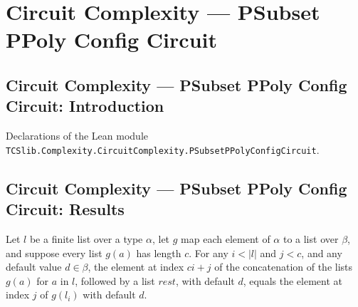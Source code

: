 \section{Circuit Complexity --- PSubset PPoly Config Circuit}
\subsection*{Circuit Complexity --- PSubset PPoly Config Circuit: Introduction}

Declarations of the Lean module \texttt{TCSlib.Complexity.CircuitComplexity.PSubsetPPolyConfigCircuit}.

\subsection*{Circuit Complexity --- PSubset PPoly Config Circuit: Results}

\begin{theorem}
\label{Complexity.getD_flatMap_chunk}
\leanok
{}
Let $l$ be a finite list over a type $\alpha$, let $g$ map each element of $\alpha$ to a
list over $\beta$, and suppose every list $g(a)$ has length $c$. For any $i<|l|$ and
$j<c$, and any default value $d\in\beta$, the element at index $ci+j$ of the
concatenation of the lists $g(a)$ for $a$ in $l$, followed by a list $rest$, with
default $d$, equals the element at index $j$ of $g(l_i)$ with default $d$.
\end{theorem}

